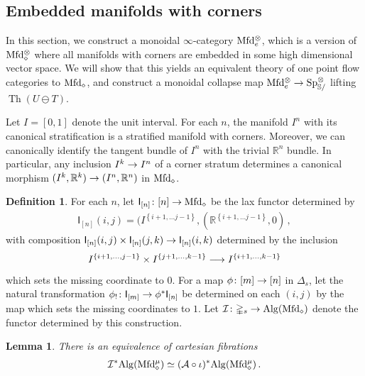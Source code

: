 \documentclass[10pt]{amsart}
\numberwithin{equation}{section}
\newtheorem{lem}[prop]{Lemma}
\theoremstyle{definition}
\newtheorem{definition}[prop]{Definition}
\DeclareMathOperator{\Th}{Th}
\newcommand{\Mfd}{\mathrm{Mfd}\vphantom{d}}
\newcommand{\Alg}{\mathrm{Alg}\vphantom{z}}
\newcommand{\bS}{\mathbb{S}}
\newcommand{\bR}{\mathbb{R}}
\newcommand{\Simp}{\mathbb{\Delta}}
\newcommand{\cA}{\mathcal{A}}
\newcommand{\cI}{\mathcal{I}}
\newcommand{\sfI}{\mathsf{I}}
\newcommand{\Sp}{\mathrm{Sp}\vphantom{p}}
\renewcommand{\to}{\mathchoice{\longrightarrow}{\rightarrow}{}{}}
\begin{document}
\subsection{Embedded manifolds with corners}\label{subsec:embedded_manifolds}
In this section, we construct a monoidal $\infty$-category $\Mfd_{e}^{\otimes}$, which is a version of $\Mfd_{\diamond}^{\otimes}$ where all manifolds with corners are embedded in some high dimensional vector space.
We will show that this yields an equivalent theory of one point flow categories to $\Mfd_{\diamond}$, and construct a monoidal collapse map $\Mfd_{e}^{\otimes} \to \Sp_{\bS/}^{\otimes}$ lifting $\Th(U\ominus T)$.

Let $I=[0,1]$ denote the unit interval.
For each $n$, the manifold $I^{n}$ with its canonical stratification is a stratified manifold with corners.
Moreover, we can canonically identify the tangent bundle of $I^{n}$ with the trivial $\bR^{n}$ bundle.
In particular, any inclusion $I^{k}\to I^{n}$ of a corner stratum determines a canonical morphism $(I^{k},\bR^{k}) \to (I^{n},\bR^{n})$ in $\Mfd_{\diamond}$.

\begin{definition}
	For each $n$, let $\sfI_{[n]} \colon [n] \to \Mfd_{\diamond}$ be the lax functor determined by
	\begin{align*}
		\sfI_{[n]}(i,j) = (I^{ \left\{i+1,\dots j-1 \right\}}, (\bR^{ \left\{ i+1,\dots j-1\right\}},0 ) \,,
	\end{align*}
	with composition $\sfI_{[n]}(i,j) \times \sfI_{[n]}(j,k)\to \sfI_{[n]}(i,k)$ determined by the inclusion
	\begin{align*}
		I^{ \left\{ i+1,\dots , j-1 \right\}  } \times I^{ \left\{ j+1, \dots , k-1 \right\}} \to I^{ \left\{ i+1,\dots, k-1\right\} }
	\end{align*}
	which sets the missing coordinate to $0$.
  For a map $\phi \colon [m] \to [n]$ in $\Simp_{s}$, let the natural transformation $\phi_{!}\colon \sfI_{[m]} \to \phi^{*}\sfI_{[n]}$ be determined on each $(i,j)$ by the map which sets the missing coordinates to $1$.
  Let $\cI\colon \Simp_{s}\to \Alg(\Mfd_{\diamond})$ denote the functor determined by this construction.
\end{definition}


\begin{lem}\label{lem:A=I}
	There is an equivalence of cartesian fibrations
	\begin{align*}
		\cI^{*}\Alg(\Mfd_{\diamond}^{\mu}) \simeq (\cA\circ \iota)^{*}\Alg(\Mfd_{\diamond}^{\mu}) \,.
	\end{align*}
\end{lem}
\end{document}
